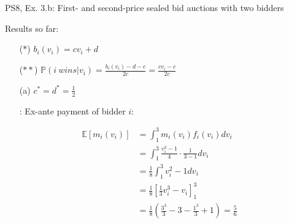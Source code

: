 \begin{frame}{PS8, Ex. 3.b: First- and second-price sealed bid auctions with two bidders}
\begin{multicols}{2}
\begin{enumerate}
      \end{enumerate}
      \vspace{-6pt}
      Results so far:
      \vspace{-6pt}
      \begin{itemize}
        \item[($*$)]  $b_i(v_i) = cv_i+d$
        \item[($**$)] $\mathbb{P}(i\ wins|v_i)=\frac{b_i(v_i)-d-c}{2c}=\frac{cv_i-c}{2c}$
        \item[(a)]    $c^*=d^*=\frac{1}{2}$
        \item[\nth{2}:] Ex-ante payment of bidder $i$:
      \end{itemize}
      \vspace{-12pt}
      \begin{align*}
        \mathbb{E}[m_i(v_i)]&=\textstyle\int_1^3m_i(v_i)f_i(v_i)dv_i\\
                            &=\textstyle\int_1^3\frac{v_i^2-1}{4}\cdot\frac{1}{3-1}dv_i\\
                            &=\frac{1}{8}\textstyle\int_1^3v_i^2-1dv_i\\
                            &=\frac{1}{8}\left[\frac{1}{3}v_i^3-v_i\right]_1^3\\
                            &=\frac{1}{8}\left(\frac{3^3}{3}-3-\frac{1^3}{3}+1\right)=\frac{5}{6}
      \end{align*}
      \vfill\null
    \end{multicols}
\end{frame}


